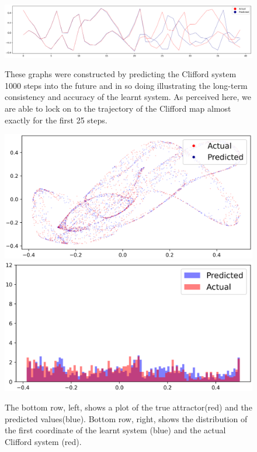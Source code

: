 \begin{figure}[ht]
  \centering
  \includegraphics[width=1.0\textwidth,left]{Graphs/_Clifford_1_nonoise.eps}
  \caption*{These graphs were constructed by predicting the Clifford system 1000 steps into the future and in so doing illustrating the long-term consistency and accuracy of the learnt system. As perceived here, we are able to lock on to the trajectory of the Clifford map almost exactly for the first 25 steps.}
      \centering
      \includegraphics[width=\linewidth]{Graphs/_Clifford_2_nonoise.eps}
  \endminipage\hfill
    \centering
    \includegraphics[width=\linewidth]{Graphs/_Clifford_3_nonoise.eps}
  \endminipage
  \caption{The bottom row, left, shows a plot of the true attractor(red) and the predicted values(blue). Bottom row, right, shows the distribution of the first coordinate of the learnt system (blue) and the actual Clifford system (red). }
  \label{fig:Clifford}
\end{figure}

